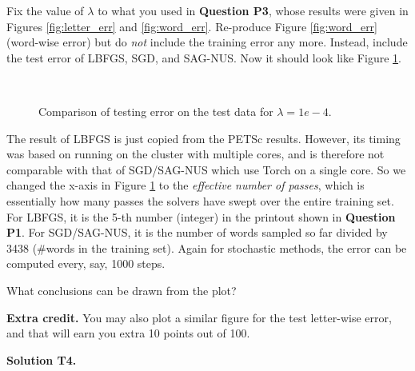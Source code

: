\documentclass[11pt]{report}
\begin{document}
Fix the value of $\lambda$ to what you used in {\bf Question P3},
whose results were given in Figures \ref{fig:letter_err} and \ref{fig:word_err}.
Re-produce Figure \ref{fig:word_err} (word-wise error) but do \emph{not} include the training error any more.
Instead, include the test error of LBFGS, SGD, and SAG-NUS.
Now it should look like Figure \ref{fig:compare_word_err}.

\begin{figure}[t]
\centering
{}
~~
\caption{Comparison of testing error on the test data for $\lambda=1e-4$.}
\label{fig:compare_word_err}
\end{figure}

The result of LBFGS is just copied from the PETSc results.
However, its timing was based on running on the cluster with multiple cores,
and is therefore not comparable with that of SGD/SAG-NUS which use Torch on a single core.
So we changed the x-axis in Figure \ref{fig:compare_word_err} to the \emph{effective number of passes}, which is essentially how many passes the solvers have swept over the entire training set.
For LBFGS, it is the 5-th number (integer) in the printout shown in {\bf Question P1}.
For SGD/SAG-NUS, it is the number of words sampled so far divided by 3438
(\#words in the training set).
Again for stochastic methods, the error can be computed every, say, 1000 steps.

What conclusions can be drawn from the plot?

{\bf Extra credit.}
You may also plot a similar figure for the test letter-wise error, and that will earn you extra 10 points out of 100.

{\bf Solution T4.}
\end{document}
